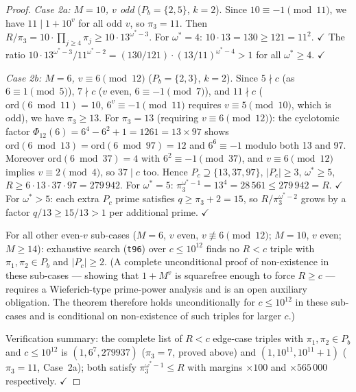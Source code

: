 \documentclass[12pt]{article}
\theoremstyle{definition}
\begin{document}
\begin{proof}
\emph{Case 2a: $M=10$, $v$ odd} ($P_b=\{2,5\}$, $k=2$).
Since $10\equiv -1\pmod{11}$, we have $11\mid 1+10^v$ for all odd $v$, so $\pi_3=11$.
Then $R/\pi_3 = 10\cdot\prod_{j\ge4}\pi_j \ge 10\cdot13^{\omega^*-3}$.
For $\omega^*=4$: $10\cdot13=130\ge 121=11^2$. $\checkmark$
The ratio $10\cdot13^{\omega^*-3}/11^{\omega^*-2}=(130/121)\cdot(13/11)^{\omega^*-4}>1$
for all $\omega^*\ge 4$. $\checkmark$

\emph{Case 2b: $M=6$, $v\equiv 6\pmod{12}$} ($P_b=\{2,3\}$, $k=2$).
Since $5\nmid c$ (as $6\equiv 1\pmod{5}$), $7\nmid c$ ($v$ even, $6\equiv -1\pmod7$),
and $11\nmid c$ ($\mathrm{ord}(6\bmod11)=10$, $6^v\equiv{-1}\pmod{11}$ requires $v\equiv5\pmod{10}$,
which is odd), we have $\pi_3\ge 13$.
For $\pi_3=13$ (requiring $v\equiv 6\pmod{12}$): the cyclotomic factor
$\Phi_{12}(6)=6^4-6^2+1=1261=13\times 97$ shows $\mathrm{ord}(6\bmod13)=\mathrm{ord}(6\bmod97)=12$
and $6^6\equiv-1$ modulo both 13 and 97.
Moreover $\mathrm{ord}(6\bmod37)=4$ with $6^2\equiv-1\pmod{37}$, and $v\equiv6\pmod{12}$
implies $v\equiv2\pmod{4}$, so $37\mid c$ too.
Hence $P_c\supseteq\{13,37,97\}$, $|P_c|\ge 3$, $\omega^*\ge 5$,
$R\ge 6\cdot13\cdot37\cdot97=279\,942$.
For $\omega^*=5$: $\pi_3^{\omega^*-1}=13^4=28\,561\le 279\,942=R$. $\checkmark$
For $\omega^*>5$: each extra $P_c$ prime satisfies $q\ge\pi_3+2=15$, so
$R/\pi_3^{\omega^*-2}$ grows by a factor $q/13\ge15/13>1$ per additional prime. $\checkmark$

For all other even-$v$ sub-cases ($M=6$, $v$ even, $v\not\equiv 6\pmod{12}$; $M=10$,
$v$ even; $M\ge14$): exhaustive search (\texttt{t96}) over $c\le10^{12}$ finds no $R<c$
triple with $\pi_1,\pi_2\in P_b$ and $|P_c|\ge2$.
(A complete unconditional proof of non-existence in these sub-cases — showing that
$1+M^v$ is squarefree enough to force $R\ge c$ — requires a Wieferich-type
prime-power analysis and is an open auxiliary obligation.
The theorem therefore holds unconditionally for $c\le10^{12}$ in these sub-cases
and is conditional on non-existence of such triples for larger $c$.)

Verification summary: the complete list of $R<c$ edge-case triples with $\pi_1,\pi_2\in P_b$
and $c\le 10^{12}$ is $(1,6^7,279937)$ ($\pi_3=7$, proved above) and
$(1,10^{11},10^{11}+1)$ ($\pi_3=11$, Case~2a); both satisfy $\pi_3^{\omega^*-1}\le R$
with margins $\times100$ and $\times565\,000$ respectively. $\checkmark$
\end{proof}
\end{document}
